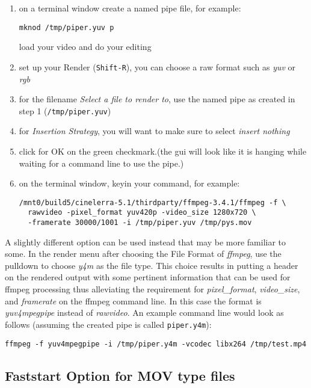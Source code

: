 \begin{enumerate}
\item on a terminal window create a named pipe file, for example:
\begin{lstlisting}[style=sh]
mknod /tmp/piper.yuv p
\end{lstlisting} load your video and do your editing
\item set up your Render (\texttt{Shift-R}), you can choose a raw
  format such as \textit{yuv} or \textit{rgb}
\item for the filename \textit{Select a file to render to}, use the
  named pipe as created in step 1 (\texttt{/tmp/piper.yuv})
\item for \textit{Insertion Strategy}, you will want to make sure to
  select \textit{insert nothing}
\item click for OK on the green checkmark.(the \CGG{} gui will look
  like it is hanging while waiting for a command line to use the
  pipe.)
\item on the terminal window, keyin your command, for example:
\begin{lstlisting}[style=sh]
/mnt0/build5/cinelerra-5.1/thirdparty/ffmpeg-3.4.1/ffmpeg -f \
  rawvideo -pixel_format yuv420p -video_size 1280x720 \
  -framerate 30000/1001 -i /tmp/piper.yuv /tmp/pys.mov
\end{lstlisting}
\end{enumerate}

A slightly different option can be used instead that may be more
familiar to some.  In the render menu after choosing the File Format
of \textit{ffmpeg}, use the pulldown to choose \textit{y4m} as the
file type.  This choice results in putting a header on the rendered
output with some pertinent information that can be used for ffmpeg
processing thus alleviating the requirement for
\textit{pixel\_format}, \textit{video\_size}, and \textit{framerate}
on the ffmpeg command line.  In this case the format is
\textit{yuv4mpegpipe} instead of \textit{rawvideo}.  An example
command line would look as follows (assuming the created pipe is
called \texttt{piper.y4m}):
\begin{lstlisting}[style=sh]
ffmpeg -f yuv4mpegpipe -i /tmp/piper.y4m -vcodec libx264 /tmp/test.mp4
\end{lstlisting}

\subsection{Faststart Option for MOV type files}%
\label{sub:faststart_option_mov0}

